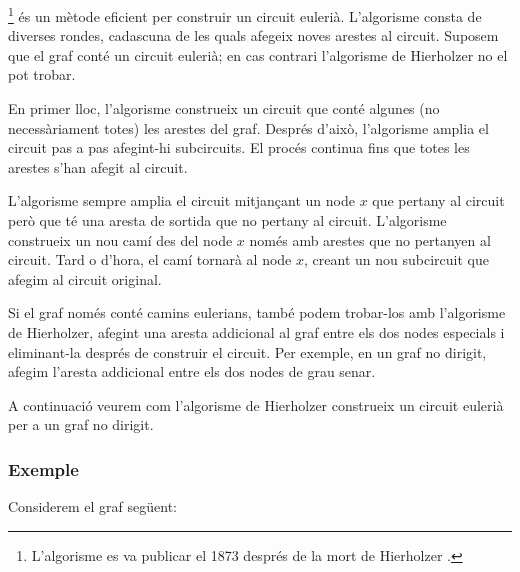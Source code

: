 \footnote{L'algorisme es va publicar el
1873 després de la mort de Hierholzer \cite{hie73}.} és un mètode
eficient per construir un circuit eulerià. L'algorisme consta de
diverses rondes, cadascuna de les quals afegeix noves arestes al
circuit. Suposem que el graf conté un circuit eulerià; en cas contrari
l'algorisme de Hierholzer no el pot trobar.

En primer lloc, l'algorisme construeix un circuit que conté algunes
(no necessàriament totes) les arestes del graf. Després d'això,
l'algorisme amplia el circuit pas a pas afegint-hi subcircuits. El
procés continua fins que totes les arestes s'han afegit al circuit.

L'algorisme sempre amplia el circuit mitjançant un node $x$ que
pertany al circuit però que té una aresta de sortida que no pertany al
circuit.  L'algorisme construeix un nou camí des del node $x$ només
amb arestes que no pertanyen al circuit. Tard o d'hora, el camí
tornarà al node $x$, creant un nou subcircuit que afegim al circuit
original.

Si el graf només conté camins eulerians, també podem trobar-los amb
l'algorisme de Hierholzer, afegint una aresta addicional al graf entre
els dos nodes especials i eliminant-la després de construir el
circuit. Per exemple, en un graf no dirigit, afegim l'aresta
addicional entre els dos nodes de grau senar.

A continuació veurem com l'algorisme de Hierholzer construeix un
circuit eulerià per a un graf no dirigit.

\subsubsection{Exemple}


\begin{samepage}
Considerem el graf següent:
\begin{center}
\end{center}
\end{samepage}


